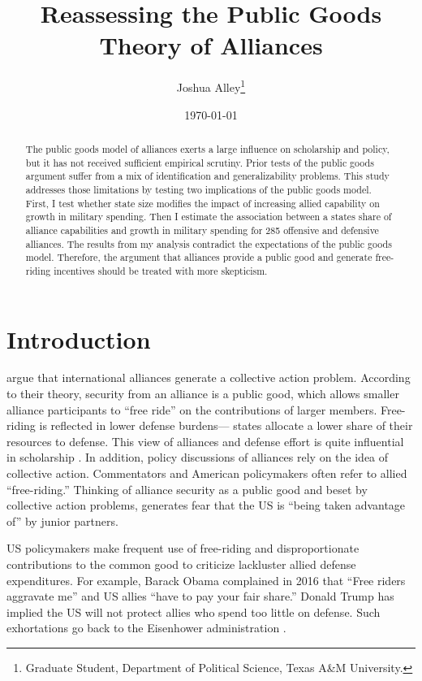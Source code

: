 \documentclass[12pt]{article}
\title{
\textbf{Reassessing the Public Goods Theory of Alliances}
	}
\author{Joshua Alley\footnote{Graduate Student,
Department of Political Science, Texas A\&M University.}}
\date{{\normalsize \today}}
\begin{document}
\maketitle 

\doublespace

\begin{abstract}
The public goods model of alliances exerts a large influence on scholarship and policy, but it has not received sufficient empirical scrutiny. 
Prior tests of the public goods argument suffer from a mix of identification and generalizability problems. 
This study addresses those limitations by testing two implications of the public goods model. 
First, I test whether state size modifies the impact of increasing allied capability on growth in military spending. 
Then I estimate the association between a states share of alliance capabilities and growth in military spending for 285 offensive and defensive alliances. 
The results from my analysis contradict the expectations of the public goods model. 
Therefore, the argument that alliances provide a public good and generate free-riding incentives should be treated with more skepticism. 

\end{abstract} 



\section{Introduction}



\citet{OlsonZeckhauser1966} argue that international alliances generate a collective action problem. 
According to their theory, security from an alliance is a public good, which allows smaller alliance participants to ``free ride'' on the contributions of larger members. 
Free-riding is reflected in lower defense burdens--- states allocate a lower share of their resources to defense.
This view of alliances and defense effort is quite influential in scholarship \citep{Walt1990, Mearsheimer1994, SandlerHartley2001, Garfinkel2004, Walt2009, Barrett2010}. 
In addition, policy discussions of alliances rely on the idea of collective action.
Commentators and American policymakers often refer to allied ``free-riding.'' 
Thinking of alliance security as a public good and beset by collective action problems, generates fear that the US is ``being taken advantage of'' by junior partners. 


US policymakers make frequent use of free-riding and disproportionate contributions to the common good to criticize lackluster allied defense expenditures.  
For example, Barack Obama complained in 2016 that ``Free riders aggravate me'' and US allies ``have to pay your fair share.'' 
Donald Trump has implied the US will not protect allies who spend too little on defense. 
Such exhortations go back to the Eisenhower administration \citep{Lanoszka2015}.
\end{document}
